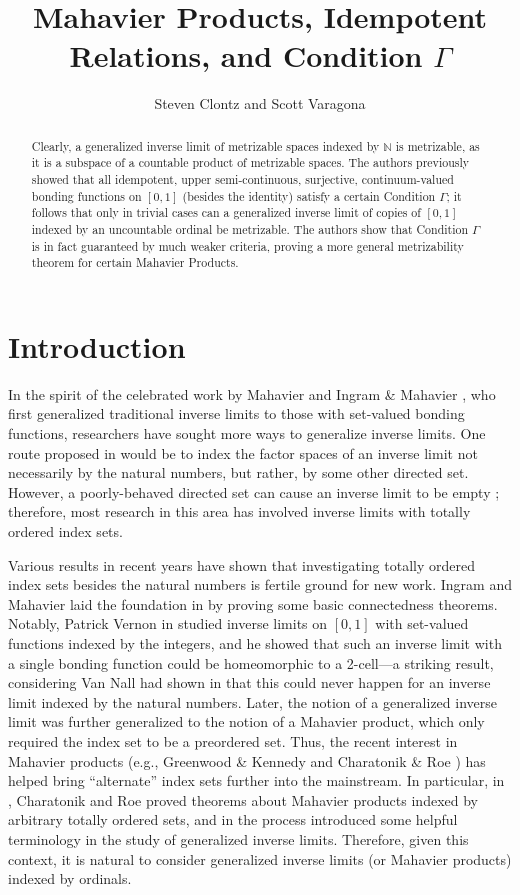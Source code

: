 \documentclass{article}
\title{Mahavier Products, Idempotent Relations, and Condition $\Gamma$}
\author{Steven Clontz and Scott Varagona}
\theoremstyle{plain}
\theoremstyle{definition}
\theoremstyle{remark}
\begin{document}
\maketitle

\begin{abstract}
Clearly, a generalized inverse limit of metrizable spaces 
indexed by \(\mathbb N\) is metrizable,
as it is a subspace of a countable product of metrizable spaces.
The authors previously showed that all idempotent, upper semi-continuous, surjective,
continuum-valued bonding functions on \([0,1]\) (besides the identity) satisfy a certain Condition \(\Gamma\);
it follows that only in trivial cases can a generalized inverse limit of
copies of \([0,1]\) indexed by an uncountable ordinal be metrizable. 
The authors show that Condition \(\Gamma\)
is in fact guaranteed by much weaker criteria, proving a more general metrizability theorem for certain Mahavier Products.
\end{abstract}

\section{Introduction}

In the spirit of the celebrated work by Mahavier \cite{Mahavier} and Ingram \& Mahavier \cite{IngMah1}, 
who first generalized traditional inverse limits to those with set-valued bonding 
functions, researchers have sought more ways to generalize inverse limits. One 
route proposed in \cite{IngMahbook} would be to index the factor spaces of an inverse limit not 
necessarily by the natural numbers, but rather, by some other directed set. 
However, a poorly-behaved directed set can cause an inverse limit to be empty \cite{IngMahbook};
therefore, most research in this area has involved inverse limits with totally  
ordered index sets.

Various results in recent years have shown that investigating totally 
ordered index sets besides the natural numbers is fertile ground for new work. 
Ingram and Mahavier laid the foundation in \cite{IngMahbook} by proving some basic connectedness 
theorems. Notably, Patrick Vernon in \cite{vernon} studied inverse limits on $[0,1]$ with 
set-valued functions indexed by the integers, and he showed that such an inverse 
limit with a single bonding function could be homeomorphic to a 2-cell---a 
striking result, considering Van Nall had shown in \cite{vannall} that this could never 
happen for an inverse limit indexed by the natural numbers.
Later, the notion of a generalized inverse limit was further generalized to the notion of a Mahavier product, which only required the index set to be a preordered set. Thus, the recent interest in Mahavier products (e.g., Greenwood \& Kennedy \cite{GreenKen} and Charatonik \& Roe \cite{charroe}) has helped bring ``alternate'' index sets further into the mainstream.
In particular, in \cite{charroe}, Charatonik and Roe proved theorems about Mahavier products indexed by arbitrary totally ordered sets, and in the process introduced some helpful terminology in the study of generalized inverse limits. Therefore, given this context, it is natural to consider generalized inverse limits (or Mahavier products) indexed by ordinals.
\end{document}
